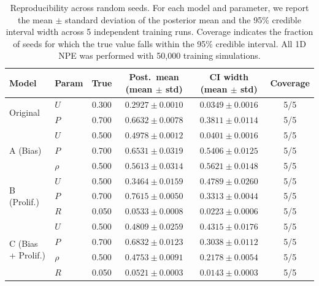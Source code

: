 \documentclass{article}
\begin{document}
\begin{table}[htbp]
	\centering
	\renewcommand{\arraystretch}{1.2}
	\begin{tabular}{@{}llcccc@{}}
		\toprule
		\textbf{Model} & \textbf{Param} & \textbf{True} & \textbf{Post.\ mean (mean $\pm$ std)} & \textbf{CI width (mean $\pm$ std)} & \textbf{Coverage} \\
		\midrule
		\multirow{2}{*}{Original} & $U$ & 0.300 & $0.2927 \pm 0.0010$ & $0.0349 \pm 0.0016$ & 5/5 \\
		& $P$ & 0.700 & $0.6632 \pm 0.0078$ & $0.3811 \pm 0.0114$ & 5/5 \\
		\midrule
		\multirow{3}{*}{A (Bias)} & $U$    & 0.500 & $0.4978 \pm 0.0012$ & $0.0401 \pm 0.0016$ & 5/5 \\
		& $P$    & 0.700 & $0.6531 \pm 0.0319$ & $0.5406 \pm 0.0125$ & 5/5 \\
		& $\rho$ & 0.500 & $0.5613 \pm 0.0314$ & $0.5621 \pm 0.0148$ & 5/5 \\
		\midrule
		\multirow{3}{*}{B (Prolif.)} & $U$ & 0.500 & $0.3464 \pm 0.0159$ & $0.4789 \pm 0.0260$ & 5/5 \\
		& $P$ & 0.700 & $0.7615 \pm 0.0050$ & $0.3313 \pm 0.0044$ & 5/5 \\
		& $R$ & 0.050 & $0.0533 \pm 0.0008$ & $0.0223 \pm 0.0006$ & 5/5 \\
		\midrule
		\multirow{4}{*}{C (Bias + Prolif.)} & $U$    & 0.500 & $0.4809 \pm 0.0259$ & $0.4315 \pm 0.0176$ & 5/5 \\
		& $P$    & 0.700 & $0.6832 \pm 0.0123$ & $0.3038 \pm 0.0112$ & 5/5 \\
		& $\rho$ & 0.500 & $0.4753 \pm 0.0091$ & $0.2178 \pm 0.0054$ & 5/5 \\
		& $R$    & 0.050 & $0.0521 \pm 0.0003$ & $0.0143 \pm 0.0003$ & 5/5 \\
		\bottomrule
	\end{tabular}
	\caption{Reproducibility across random seeds. For each model and parameter, we report the mean $\pm$ standard deviation of the posterior mean and the 95\% credible interval width across 5 independent training runs. Coverage indicates the fraction of seeds for which the true value falls within the 95\% credible interval. All 1D NPE was performed with 50{,}000 training simulations.}
	\label{tab:seed_study}
\end{table}
\end{document}
